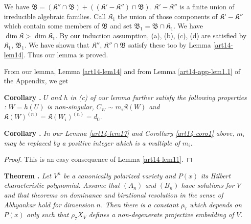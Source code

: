 We have $\mathfrak{B}=(\mathfrak{K}''\cap \mathfrak{B})+((\mathfrak{K}'-\mathfrak{K}'')\cap \mathfrak{B})$. $\mathfrak{K}'-\mathfrak{K}''$ is a finite union of irreducible algebraic families. Call $\mathfrak{K}_{1}$ the union of those components of $\mathfrak{K}'-\mathfrak{K}''$ which contain some members of $\mathfrak{B}$ and set $\mathfrak{B}_{1}=\mathfrak{B}\cap \mathfrak{K}_{1}$. We have $\dim \mathfrak{K}>\dim \mathfrak{K}_{1}$. By our induction assumption, (a), (b), (c), (d) are satisfied by $\mathfrak{K}_{1}$, $\mathfrak{B}_{1}$. We have shown that $\mathfrak{K}''$, $\mathfrak{K}''\cap \mathfrak{B}$ satisfy these too by Lemma \ref{art14-lem14}. Thus our lemma is proved.

From our lemma, Lemma \ref{art14-lem14} and from Lemma \ref{art14-app-lem1.1} of the Appendix, we get

\medskip
\noindent
{\bf Corollary .\label{art14-coro1}}
{\em $U$ and $h$ in {\rm(c)} of our lemma further satisfy the following properties : $W=h(U)$ is non-singular, $C_{W}\sim m_{i}\mathfrak{K}(W)$ and $\mathfrak{K}(W)^{(n)}=\mathfrak{K}(W_{i})^{(n)}=d_{0}$.}

\medskip
\noindent
{\bf Corollary .\label{art14-coro2}}
{\em In our Lemma \ref{art14-lem17} and Corollary \ref{art14-coro1} above, $m_{i}$ may be replaced by a positive integer which is a multiple of $m_{i}$.}

\begin{proof}
This is an easy consequence of Lemma \ref{art14-lem11}.
\end{proof}

\smallskip
\noindent
{\bf Theorem .\label{art14-thm2}}
{\em Let $V^{n}$ be a canonically polarized variety and $P(x)$ its Hilbert characteristic polynomial. Assume that $(A_{n})$ and $(B_{n})$ have solutions for $V$ and that theorems on dominance and birational resolution in the sense of Abhyankar hold for dimension $n$. Then there is a constant $\rho_{7}$ which depends on $P(x)$ only such that $\rho_{7}X_{V}$ defines a non-degenerate projective embedding of $V$.}

